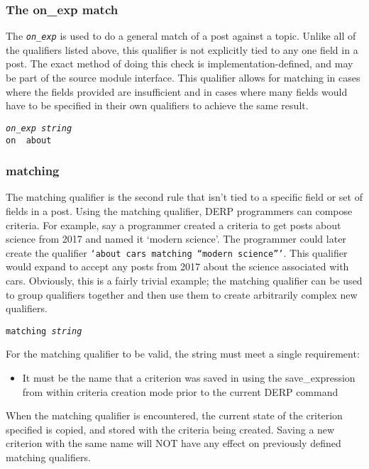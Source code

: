 \subsubsection{The on\_exp match}
The \texttt{\textit{on\_exp}} is used to do a general match of a post against a topic. Unlike all of the qualifiers listed above, this qualifier is not explicitly
tied to any one field in a post. The exact method of doing this check is implementation-defined, and may be part of the source module interface. This qualifier
allows for matching in cases where the fields provided are insufficient and in cases where many fields would have to be specified in their own qualifiers to achieve
the same result.
\begin{description}[labelindent=1cm,leftmargin=\onelen,labelwidth=1cm]
       \texttt{\textit{on\_exp string}}\\
       \texttt{on \textbf{\textbar} about}\\
\end{description}




\subsubsection{matching}
The matching qualifier is the second rule that isn’t tied to a specific field or set of fields in a post. Using the matching qualifier, DERP programmers can compose criteria.
For example, say a programmer created a criteria to get posts about science from 2017 and named it ‘modern science’. The programmer could later create the qualifier \texttt{‘about cars matching “modern science”’}.
This qualifier would expand to accept any posts from 2017 about the science associated with cars. Obviously, this is a fairly trivial example; the matching qualifier can be
used to group qualifiers together and then use them to create arbitrarily complex new qualifiers.
\begin{description}[labelindent=1cm,leftmargin=\onelen,labelwidth=1cm]
      \texttt{matching \textit{string}}\\
\end{description}
For the matching qualifier to be valid, the string must meet a single requirement:
\begin{itemize}
\item It must be the name that a criterion was saved in using the save\_expression from within criteria creation mode prior to the current DERP command
\end{itemize}
When the matching qualifier is encountered, the current state of the criterion specified is copied, and stored with the criteria being created.
Saving a new criterion with the same name will NOT have any effect on previously defined matching qualifiers.



